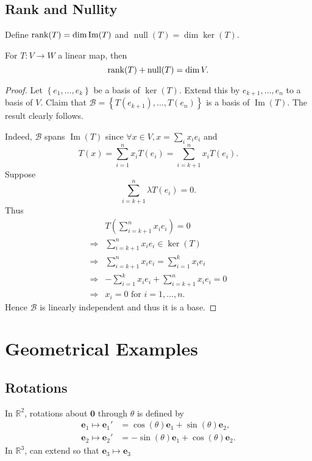 \documentclass[10pt]{article}
\DeclareMathOperator{\im}{Im}
\DeclareMathOperator{\nullity}{null}
\begin{document}
    \subsection{Rank and Nullity}
    Define $ \rank(T)=\dim \im(T) $ and $ \nullity(T)=\dim \ker(T) $.
    \begin{theorem}\label{thm:r-n thm}
        For $ T:V\to W $ a linear map, then 
        \[
            \rank(T)+\nullity(T)=\dim V
        .\]
    \end{theorem}
    \begin{proof}
        Let $ \left\{ e_1,\dots,e_k\right\} $ be a basis of $\ker(T)$. Extend this by $ e_{k+1},\dots,e_n $ to a basis of $V$. Claim that $ \mathcal{B}=\left\{ T(e_{k+1}),\dots,T(e_n)\right\} $ is a basis of $\im(T)$. The result clearly follows.

        Indeed, $ \mathcal{B} $ spans $\im(T)$ since $ \forall x\in V, x=\sum_{i}x_ie_i $ and 
        \[
            T(x)=\sum_{i=1}^{n}x_iT(e_i)=\sum_{i=k+1}^{n}x_iT(e_i)
        .\]
        Suppose 
        \[
            \sum_{i=k+1}^{n}\lambda T(e_i)=0
        .\]
        Thus 
        \[
            \begin{aligned}
                 &T\left( \sum_{i=k+1}^{n}x_ie_i \right)=0\\
                 \Longrightarrow & \sum_{i=k+1}^{n}x_ie_i\in \ker(T)\\
                 \Longrightarrow & \sum_{i=k+1}^{n}x_ie_i=\sum_{i=1}^{k}x_ie_i\\
                 \Longrightarrow & -\sum_{i=1}^{k}x_i e_i+\sum_{i=k+1}^{n}x_ie_i=0\\
                 \Longrightarrow &x_i=0 \text{ for } i=1,\dots,n.
            \end{aligned}
        \]
        Hence $ \mathcal{B} $ is linearly independent and thus it is a base.
    \end{proof}
    \section{Geometrical Examples}
    \subsection{Rotations}
    In $ \mathbb{R}^{2} $, rotations about $\mathbf{0}$ through $ \theta $ is defined by 
    \[\begin{aligned}
         \mathbf{e}_1\mapsto \mathbf{e}_1'&=\cos(\theta)\mathbf{e}_1+\sin(\theta)\mathbf{e}_2,\\
         \mathbf{e}_2\mapsto \mathbf{e}_2'&=-\sin(\theta)\mathbf{e}_1+\cos(\theta)\mathbf{e}_2.
    \end{aligned}\]
    In $ \mathbb{R}^{3} $, can extend so that $ \mathbf{e}_3\mapsto \mathbf{e}_3 $
\end{document}
